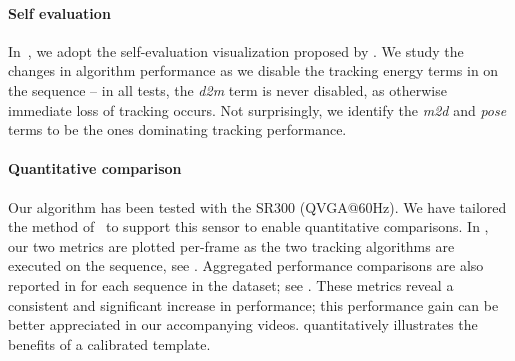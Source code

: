 
\paragraph{Self evaluation}
% 
In~, we adopt the self-evaluation visualization proposed by \cite{taylor2016concerto}. We study the changes in algorithm performance as we disable the tracking energy terms in  on the  sequence -- in all tests, the \emph{d2m} term is never disabled, as otherwise immediate loss of tracking occurs. Not surprisingly, we identify the \emph{m2d} and \emph{pose} terms to be the ones dominating tracking performance. 
% 
% 


\paragraph{Quantitative comparison}
Our algorithm has been tested with the \realsense{} SR300 (QVGA@60Hz).  We have tailored the method of~\cite{tagliasacchi2015robust} to support this sensor to enable quantitative comparisons. In , our two metrics are plotted per-frame as the two tracking algorithms are executed on the  sequence,  see \VideoHTrack{}. Aggregated performance comparisons are also reported in  for each sequence in the \handy{} dataset; see \VideoExtra{}. These metrics reveal a consistent and significant increase in performance; this performance gain can be better appreciated in our accompanying videos.  quantitatively illustrates the benefits of a calibrated template.

